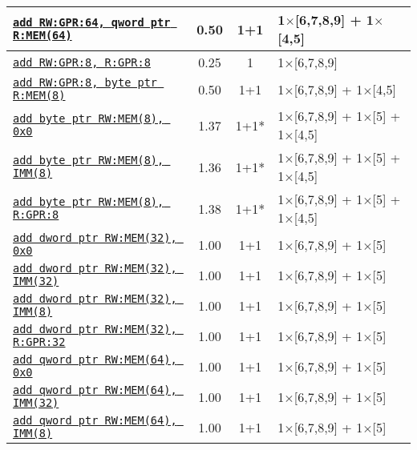\documentclass[a4paper,english,fontsize=9]{scrartcl}
\begin{document}
\begin{longtable}{p{}ccL{.25\textwidth}}
  \midrule
  \texttt{\href{https://felixcloutier.com/x86/ADD.html}{add RW:GPR:64, qword ptr R:MEM(64)}} & 0.50 & 1+1 & 1\(\times\)[6,7,8,9] + 1\(\times\)[4,5] \\
  \midrule
  \texttt{\href{https://felixcloutier.com/x86/ADD.html}{add RW:GPR:8, R:GPR:8}} & 0.25 & 1 & 1\(\times\)[6,7,8,9] \\
  \midrule
  \texttt{\href{https://felixcloutier.com/x86/ADD.html}{add RW:GPR:8, byte ptr R:MEM(8)}} & 0.50 & 1+1 & 1\(\times\)[6,7,8,9] + 1\(\times\)[4,5] \\
  \midrule
  \texttt{\href{https://felixcloutier.com/x86/ADD.html}{add byte ptr RW:MEM(8), 0x0}} & 1.37 & 1+1* & 1\(\times\)[6,7,8,9] + 1\(\times\)[5] + 1\(\times\)[4,5] \\
  \midrule
  \texttt{\href{https://felixcloutier.com/x86/ADD.html}{add byte ptr RW:MEM(8), IMM(8)}} & 1.36 & 1+1* & 1\(\times\)[6,7,8,9] + 1\(\times\)[5] + 1\(\times\)[4,5] \\
  \midrule
  \texttt{\href{https://felixcloutier.com/x86/ADD.html}{add byte ptr RW:MEM(8), R:GPR:8}} & 1.38 & 1+1* & 1\(\times\)[6,7,8,9] + 1\(\times\)[5] + 1\(\times\)[4,5] \\
  \midrule
  \texttt{\href{https://felixcloutier.com/x86/ADD.html}{add dword ptr RW:MEM(32), 0x0}} & 1.00 & 1+1 & 1\(\times\)[6,7,8,9] + 1\(\times\)[5] \\
  \midrule
  \texttt{\href{https://felixcloutier.com/x86/ADD.html}{add dword ptr RW:MEM(32), IMM(32)}} & 1.00 & 1+1 & 1\(\times\)[6,7,8,9] + 1\(\times\)[5] \\
  \midrule
  \texttt{\href{https://felixcloutier.com/x86/ADD.html}{add dword ptr RW:MEM(32), IMM(8)}} & 1.00 & 1+1 & 1\(\times\)[6,7,8,9] + 1\(\times\)[5] \\
  \midrule
  \texttt{\href{https://felixcloutier.com/x86/ADD.html}{add dword ptr RW:MEM(32), R:GPR:32}} & 1.00 & 1+1 & 1\(\times\)[6,7,8,9] + 1\(\times\)[5] \\
  \midrule
  \texttt{\href{https://felixcloutier.com/x86/ADD.html}{add qword ptr RW:MEM(64), 0x0}} & 1.00 & 1+1 & 1\(\times\)[6,7,8,9] + 1\(\times\)[5] \\
  \midrule
  \texttt{\href{https://felixcloutier.com/x86/ADD.html}{add qword ptr RW:MEM(64), IMM(32)}} & 1.00 & 1+1 & 1\(\times\)[6,7,8,9] + 1\(\times\)[5] \\
  \midrule
  \texttt{\href{https://felixcloutier.com/x86/ADD.html}{add qword ptr RW:MEM(64), IMM(8)}} & 1.00 & 1+1 & 1\(\times\)[6,7,8,9] + 1\(\times\)[5] \\
  \midrule

\end{longtable}
\end{document}
